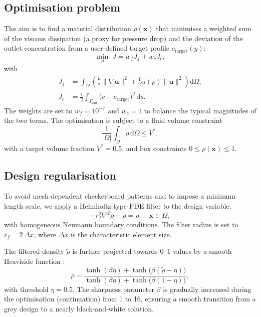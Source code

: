 \documentclass[12pt]{article}
\begin{document}
\subsection{Optimisation problem}
The aim is to find a material distribution $\rho(\mathbf{x})$ that minimises a weighted sum of the viscous dissipation (a proxy for pressure drop) and the deviation of the outlet concentration from a user‑defined target profile $c_{\text{target}}(y)$:
\begin{equation}
\min_{\rho} \; J = w_f J_f + w_c J_c, \label{eq:J}
\end{equation}
with
\begin{align}
J_f &= \int_\Omega \left( \frac{\mu}{2} \|\nabla \mathbf{u}\|^2 + \frac{1}{2} \alpha(\rho) \|\mathbf{u}\|^2 \right) \mathrm{d}\Omega, \label{eq:Jf}\\
J_c &= \frac{1}{2} \int_{\Gamma_{\text{out}}} \bigl( c - c_{\text{target}} \bigr)^2 \, \mathrm{d}s. \label{eq:Jc}
\end{align}
The weights are set to $w_f = 10^{-7}$ and $w_c = 1$ to balance the typical magnitudes of the two terms. The optimisation is subject to a fluid volume constraint
\begin{equation}
\frac{1}{|\Omega|} \int_\Omega \rho \, \mathrm{d}\Omega \le V^*, \label{eq:vol}
\end{equation}
with a target volume fraction $V^* = 0.5$, and box constraints $0 \le \rho(\mathbf{x}) \le 1$.

\subsection{Design regularisation}
To avoid mesh‑dependent checkerboard patterns and to impose a minimum length scale, we apply a Helmholtz‑type PDE filter \cite{poulsen2003, lazarov2011} to the design variable:
\begin{equation}
- r_f^2 \nabla^2 \tilde{\rho} + \tilde{\rho} = \rho, \quad \mathbf{x} \in \Omega, \label{eq:filter}
\end{equation}
with homogeneous Neumann boundary conditions. The filter radius is set to $r_f = 2\,\Delta x$, where $\Delta x$ is the characteristic element size.

The filtered density $\tilde{\rho}$ is further projected towards 0–1 values by a smooth Heaviside function \cite{wang2011}:
\begin{equation}
\bar{\rho} = \frac{\tanh(\beta\eta) + \tanh\bigl(\beta(\tilde{\rho} - \eta)\bigr)}{\tanh(\beta\eta) + \tanh\bigl(\beta(1-\eta)\bigr)}, \label{eq:heaviside}
\end{equation}
with threshold $\eta = 0.5$. The sharpness parameter $\beta$ is gradually increased during the optimisation (continuation) from 1 to 16, ensuring a smooth transition from a grey design to a nearly black‑and‑white solution.
\end{document}
